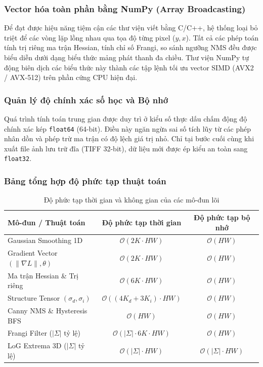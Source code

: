\documentclass[conference]{IEEEtran}
\begin{document}
\subsubsection{Vector hóa toàn phần bằng NumPy (Array Broadcasting)}
Để đạt được hiệu năng tiệm cận các thư viện viết bằng C/C++, hệ thống loại bỏ triệt để các vòng lặp lồng nhau qua tọa độ từng pixel ($y, x$). Tất cả các phép toán tính trị riêng ma trận Hessian, tính chỉ số Frangi, so sánh ngưỡng NMS đều được biểu diễn dưới dạng biểu thức mảng phát thanh đa chiều. Thư viện NumPy tự động biên dịch các biểu thức này thành các tập lệnh tối ưu vector SIMD (AVX2 / AVX-512) trên phần cứng CPU hiện đại.

\subsubsection{Quản lý độ chính xác số học và Bộ nhớ}
Quá trình tính toán trung gian được duy trì ở kiểu số thực dấu chấm động độ chính xác kép \texttt{float64} (64-bit). Điều này ngăn ngừa sai số tích lũy từ các phép nhân dồn và phép trừ ma trận có độ lệch giá trị nhỏ. Chỉ tại bước cuối cùng khi xuất file ảnh lưu trữ đĩa (TIFF 32-bit), dữ liệu mới được ép kiểu an toàn sang \texttt{float32}.

\subsubsection{Bảng tổng hợp độ phức tạp thuật toán}
\begin{table}[t]
\caption{Độ phức tạp thời gian và không gian của các mô-đun lõi}
\centering
\begin{tabular}{lcc}
\toprule
\textbf{Mô-đun / Thuật toán} & \textbf{Độ phức tạp thời gian} & \textbf{Độ phức tạp bộ nhớ} \\
\midrule
Gaussian Smoothing 1D & $\mathcal{O}(2K \cdot HW)$ & $\mathcal{O}(HW)$ \\
Gradient Vector $(\|\nabla L\|, \theta)$ & $\mathcal{O}(2K \cdot HW)$ & $\mathcal{O}(HW)$ \\
Ma trận Hessian \& Trị riêng & $\mathcal{O}(6K \cdot HW)$ & $\mathcal{O}(HW)$ \\
Structure Tensor $(\sigma_d, \sigma_i)$ & $\mathcal{O}((4K_d + 3K_i) \cdot HW)$ & $\mathcal{O}(HW)$ \\
Canny NMS \& Hysteresis BFS & $\mathcal{O}(HW)$ & $\mathcal{O}(HW)$ \\
Frangi Filter ($|\Sigma|$ tỷ lệ) & $\mathcal{O}(|\Sigma| \cdot 6K \cdot HW)$ & $\mathcal{O}(HW)$ \\
LoG Extrema 3D ($|\Sigma|$ tỷ lệ) & $\mathcal{O}(|\Sigma| \cdot HW)$ & $\mathcal{O}(|\Sigma| \cdot HW)$ \\
\bottomrule
\end{tabular}
\label{tab:complexity}
\end{table}
\end{document}
